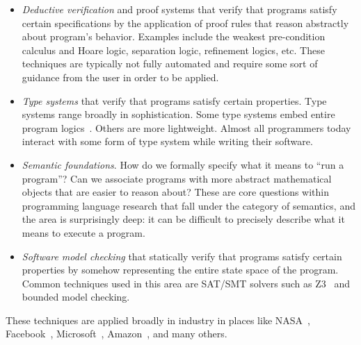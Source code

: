 \documentclass{tufte-handout}
\begin{document}
\begin{itemize}
  \item \emph{Deductive verification} and proof systems that verify that 
  programs satisfy certain specifications by the application of proof 
  rules that reason abstractly about program's behavior. Examples include the weakest
  pre-condition calculus and Hoare logic, separation logic, refinement logics, etc. 
  These techniques are typically not fully automated and require some sort of 
  guidance from the user in order to be applied.
  \item \emph{Type systems} that verify that programs satisfy certain
  properties. Type systems range broadly in sophistication. Some type systems 
  embed entire program logics~\citep{jhala2021refinement}. Others are more lightweight.
  Almost all programmers today interact with some form of type system while 
  writing their software.
  \item \emph{Semantic foundations}. How do we formally specify what it means to ``run a program''? 
  Can we associate programs with more abstract mathematical objects that are easier to 
  reason about? These are core questions within programming language research that fall under 
  the category of semantics, and the area is surprisingly deep: it can be difficult to precisely 
  describe what it means to execute a program.
  \item \emph{Software model checking} that statically verify that programs satisfy 
  certain properties by somehow representing the entire state space of the program.
  Common techniques used in this area are SAT/SMT solvers such as Z3~\citep{de2008z3}
  and bounded model checking.
\end{itemize}

These techniques are applied broadly in industry in places like NASA~\citep{calcagno2015moving}, 
Facebook~\citep{distefano2019scaling}, Microsoft~\citep{ball2004slam}, Amazon~\citep{newcombe2015amazon}, and 
many others.
\end{document}
